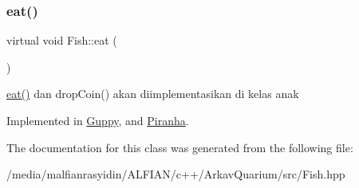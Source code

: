\subsubsection{\texorpdfstring{eat()}{eat()}}
{\footnotesize\ttfamily virtual void Fish\+::eat (\begin{DoxyParamCaption}{ }\end{DoxyParamCaption})\hspace{0.3cm}{\ttfamily [pure virtual]}}

\mbox{\hyperlink{class_fish_af209980bd39b8de9b4bb38b7ad4edd04}{eat()}} dan drop\+Coin() akan diimplementasikan di kelas anak 

Implemented in \mbox{\hyperlink{class_guppy_afe934262a0988e4ad041f4ed3a1a7e02}{Guppy}}, and \mbox{\hyperlink{class_piranha_ac48c0256edd56c427b3d82f6e0d4df82}{Piranha}}.



The documentation for this class was generated from the following file\+:\begin{DoxyCompactItemize}
\item 
/media/malfianrasyidin/\+A\+L\+F\+I\+A\+N/c++/\+Arkav\+Quarium/src/Fish.\+hpp\end{DoxyCompactItemize}
